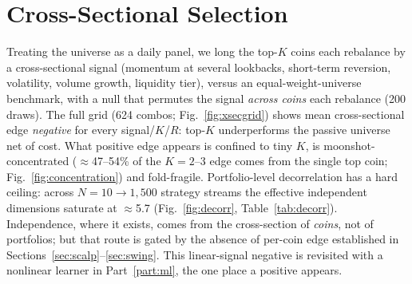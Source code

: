 \documentclass[12pt]{article}
\begin{document}
\section{Cross-Sectional Selection}\label{sec:xsec}
Treating the universe as a daily panel, we long the top-$K$ coins each rebalance by a cross-sectional signal (momentum at several lookbacks, short-term reversion, volatility, volume growth, liquidity tier), versus an equal-weight-universe benchmark, with a null that permutes the signal \emph{across coins} each rebalance (200 draws). The full grid (624 combos; Fig.~\ref{fig:xsecgrid}) shows mean cross-sectional edge \emph{negative} for every signal/$K$/$R$: top-$K$ underperforms the passive universe net of cost. What positive edge appears is confined to tiny $K$, is moonshot-concentrated ($\approx$47--54\% of the $K\!=\!2$--3 edge comes from the single top coin; Fig.~\ref{fig:concentration}) and fold-fragile. Portfolio-level decorrelation has a hard ceiling: across $N=10\to1{,}500$ strategy streams the effective independent dimensions saturate at $\approx$5.7 (Fig.~\ref{fig:decorr}, Table~\ref{tab:decorr}). Independence, where it exists, comes from the cross-section of \emph{coins}, not of portfolios; but that route is gated by the absence of per-coin edge established in Sections~\ref{sec:scalp}--\ref{sec:swing}. This linear-signal negative is revisited with a nonlinear learner in Part~\ref{part:ml}, the one place a positive appears.
\end{document}

